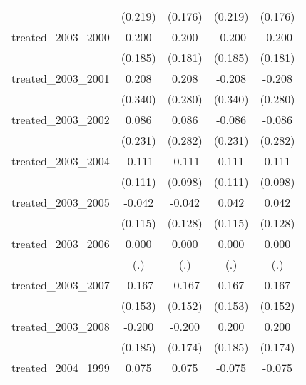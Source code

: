 {\begin{tabular}{l*{4}{c}}
            &     (0.219)         &     (0.176)         &     (0.219)         &     (0.176)         \\
[1em]
treated\_2003\_2000&       0.200         &       0.200         &      -0.200         &      -0.200         \\
            &     (0.185)         &     (0.181)         &     (0.185)         &     (0.181)         \\
[1em]
treated\_2003\_2001&       0.208         &       0.208         &      -0.208         &      -0.208         \\
            &     (0.340)         &     (0.280)         &     (0.340)         &     (0.280)         \\
[1em]
treated\_2003\_2002&       0.086         &       0.086         &      -0.086         &      -0.086         \\
            &     (0.231)         &     (0.282)         &     (0.231)         &     (0.282)         \\
[1em]
treated\_2003\_2004&      -0.111         &      -0.111         &       0.111         &       0.111         \\
            &     (0.111)         &     (0.098)         &     (0.111)         &     (0.098)         \\
[1em]
treated\_2003\_2005&      -0.042         &      -0.042         &       0.042         &       0.042         \\
            &     (0.115)         &     (0.128)         &     (0.115)         &     (0.128)         \\
[1em]
treated\_2003\_2006&       0.000         &       0.000         &       0.000         &       0.000         \\
            &         (.)         &         (.)         &         (.)         &         (.)         \\
[1em]
treated\_2003\_2007&      -0.167         &      -0.167         &       0.167         &       0.167         \\
            &     (0.153)         &     (0.152)         &     (0.153)         &     (0.152)         \\
[1em]
treated\_2003\_2008&      -0.200         &      -0.200         &       0.200         &       0.200         \\
            &     (0.185)         &     (0.174)         &     (0.185)         &     (0.174)         \\
[1em]
treated\_2004\_1999&       0.075         &       0.075         &      -0.075         &      -0.075         \\

\end{tabular}}
